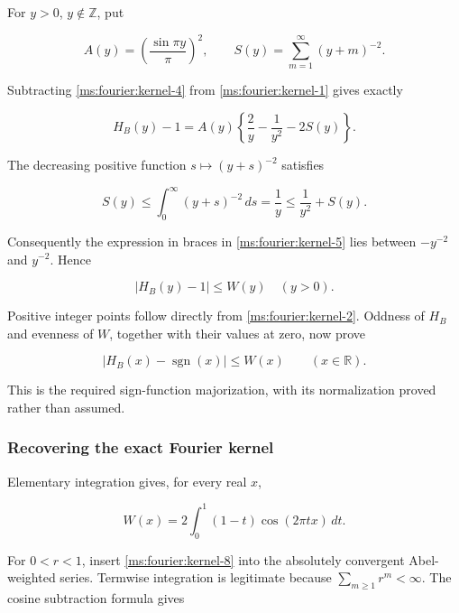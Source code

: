 For \(y>0\), \(y\notin\mathbb Z\), put

\[
 A(y)=\left(\frac{\sin\pi y}{\pi}\right)^2,
 \qquad S(y)=\sum_{m=1}^{\infty}(y+m)^{-2}.
\]

Subtracting \eqref{ms:fourier:kernel-4} from \eqref{ms:fourier:kernel-1} gives exactly

\begin{equation}
 H_B(y)-1=A(y)\left\{\frac2y-\frac1{y^2}-2S(y)\right\}.
 \label{ms:fourier:kernel-5}
\end{equation}

The decreasing positive function \(s\mapsto(y+s)^{-2}\) satisfies

\begin{equation}
 S(y)\le\int_0^\infty(y+s)^{-2}\,ds=\frac1y
       \le\frac1{y^2}+S(y).
 \label{ms:fourier:kernel-6}
\end{equation}

Consequently the expression in braces in \eqref{ms:fourier:kernel-5} lies between
\(-y^{-2}\) and \(y^{-2}\). Hence

\[
 |H_B(y)-1|\le W(y)\quad(y>0).
\]

Positive integer points follow directly from \eqref{ms:fourier:kernel-2}. Oddness of \(H_B\) and
evenness of \(W\), together with their values at zero, now prove

\begin{equation}
 |H_B(x)-\operatorname{sgn}(x)|\le W(x)
 \qquad(x\in\mathbb R).                              \label{ms:fourier:kernel-7}
\end{equation}

This is the required sign-function majorization, with its normalization
proved rather than assumed.

\subsubsection{Recovering the exact Fourier kernel}

Elementary integration gives, for every real \(x\),

\begin{equation}
 W(x)=2\int_0^1(1-t)\cos(2\pi tx)\,dt.              \label{ms:fourier:kernel-8}
\end{equation}

For \(0<r<1\), insert \eqref{ms:fourier:kernel-8} into the absolutely convergent Abel-weighted
series. Termwise integration is legitimate because
\(\sum_{m\ge1}r^m<\infty\). The cosine subtraction formula gives

